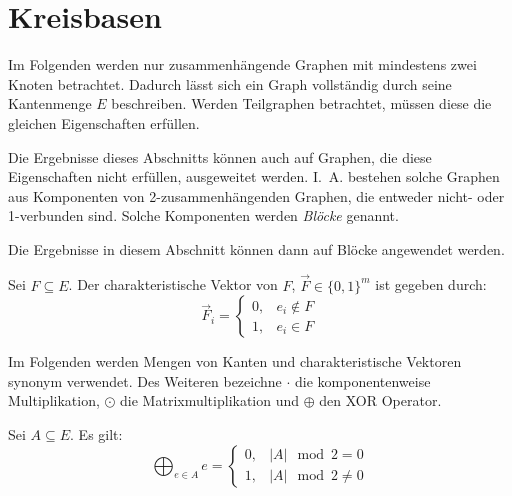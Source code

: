 \section{Kreisbasen}

Im Folgenden werden nur zusammenhängende Graphen mit mindestens zwei Knoten betrachtet.
Dadurch lässt sich ein Graph vollständig durch seine Kantenmenge $ E $ beschreiben.
Werden Teilgraphen betrachtet, müssen diese die gleichen Eigenschaften erfüllen.

\begin{remark}
    Die Ergebnisse dieses Abschnitts können auch auf Graphen, die diese Eigenschaften nicht erfüllen, ausgeweitet werden.
    I.~A. bestehen solche Graphen aus Komponenten von 2-zusammenhängenden Graphen, die entweder nicht- oder 1-verbunden sind.
    Solche Komponenten werden \textit{Blöcke} genannt.

    Die Ergebnisse in diesem Abschnitt können dann auf Blöcke angewendet werden.
\end{remark}

\begin{definition}
    Sei $ F \subseteq E $.
    Der charakteristische Vektor von $ F $, $ \vec{F} \in \{ 0, 1 \}^m $ ist gegeben durch:
    \begin{equation*}
        \vec{F}_i = \begin{cases}
            0, & e_i \notin F \\
            1, & e_i \in F
        \end{cases}
    \end{equation*}
\end{definition}

Im Folgenden werden Mengen von Kanten und charakteristische Vektoren synonym verwendet.
Des Weiteren bezeichne $ \cdot $ die komponentenweise Multiplikation, $ \odot $ die Matrixmultiplikation und $ \oplus $ den XOR Operator.

\begin{proposition}
    \label{prp:xor-odd-even}
    Sei $ A \subseteq E $.
    Es gilt:
    \begin{equation*}
        \bigoplus_{e \in A} e = \begin{cases}
            0, & |A| \mod 2 = 0 \\
            1, & |A| \mod 2 \ne 0
        \end{cases}
    \end{equation*}
\end{proposition}


